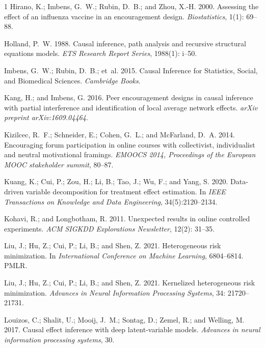 \documentclass[journal]{IEEEtran}
\begin{document}
\begin{thebibliography}{1}
Hirano, K.; Imbens, G.~W.; Rubin, D.~B.; and Zhou, X.-H. 2000.
\newblock Assessing the effect of an influenza vaccine in an encouragement design.
\newblock \emph{Biostatistics}, 1(1): 69--88.

Holland, P.~W. 1988.
\newblock Causal inference, path analysis and recursive structural equations models.
\newblock \emph{ETS Research Report Series}, 1988(1): i--50.

Imbens, G.~W.; Rubin, D.~B.; et~al. 2015.
\newblock Causal Inference for Statistics, Social, and Biomedical Sciences.
\newblock \emph{Cambridge Books}.

Kang, H.; and Imbens, G. 2016.
\newblock Peer encouragement designs in causal inference with partial interference and identification of local average network effects.
\newblock \emph{arXiv preprint arXiv:1609.04464}.

Kizilcec, R.~F.; Schneider, E.; Cohen, G.~L.; and McFarland, D.~A. 2014.
\newblock Encouraging forum participation in online courses with collectivist, individualist and neutral motivational framings.
\newblock \emph{EMOOCS 2014, Proceedings of the European MOOC stakeholder summit}, 80--87.


Kuang, K.; Cui, P.; Zou, H.; Li, B.; Tao, J.; Wu, F.; and Yang, S. 2020.
\newblock Data-driven variable decomposition for treatment effect estimation.
\newblock In \emph{IEEE Transactions on Knowledge and Data Engineering}, 34(5):2120--2134.


Kohavi, R.; and Longbotham, R. 2011.
\newblock Unexpected results in online controlled experiments.
\newblock \emph{ACM SIGKDD Explorations Newsletter}, 12(2): 31--35.

Liu, J.; Hu, Z.; Cui, P.; Li, B.; and Shen, Z. 2021.
\newblock Heterogeneous risk minimization.
\newblock In \emph{International Conference on Machine Learning}, 6804--6814. PMLR.

Liu, J.; Hu, Z.; Cui, P.; Li, B.; and Shen, Z. 2021.
\newblock Kernelized heterogeneous risk minimization.
\newblock \emph{Advances in Neural Information Processing Systems}, 34: 21720--21731.

Louizos, C.; Shalit, U.; Mooij, J.~M.; Sontag, D.; Zemel, R.; and Welling, M. 2017.
\newblock Causal effect inference with deep latent-variable models.
\newblock \emph{Advances in neural information processing systems}, 30.


\end{thebibliography}
\end{document}
